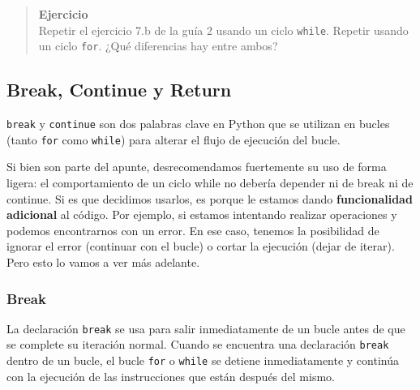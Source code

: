 \documentclass[
  letterpaper,
  DIV=11,
  numbers=noendperiod]{scrreprt}
\begin{document}
\begin{quote}
\textbf{Ejercicio}\\
Repetir el ejercicio 7.b de la guía 2 usando un ciclo \texttt{while}.
Repetir usando un ciclo \texttt{for}. ¿Qué diferencias hay entre ambos?
~
\end{quote}

\subsection{Break, Continue y Return}\label{break-continue-y-return}

\texttt{break} y \texttt{continue} son dos palabras clave en Python que
se utilizan en bucles (tanto \texttt{for} como \texttt{while}) para
alterar el flujo de ejecución del bucle.

\begin{tcolorbox}[enhanced jigsaw, opacitybacktitle=0.6, toptitle=1mm, toprule=.15mm, arc=.35mm, breakable, bottomrule=.15mm, opacityback=0, leftrule=.75mm, rightrule=.15mm, title=\textcolor{quarto-callout-warning-color}{\faExclamationTriangle}\hspace{0.5em}{Warning}, left=2mm, bottomtitle=1mm, colframe=quarto-callout-warning-color-frame, colback=white, titlerule=0mm, coltitle=black, colbacktitle=quarto-callout-warning-color!10!white]

Si bien son parte del apunte, desrecomendamos fuertemente su uso de
forma ligera: el comportamiento de un ciclo while no debería depender ni
de break ni de continue. Si es que decidimos usarlos, es porque le
estamos dando \textbf{funcionalidad adicional} al código. Por ejemplo,
si estamos intentando realizar operaciones y podemos encontrarnos con un
error. En ese caso, tenemos la posibilidad de ignorar el error
(continuar con el bucle) o cortar la ejecución (dejar de iterar). Pero
esto lo vamos a ver más adelante.

\end{tcolorbox}

\subsubsection{Break}\label{break}

La declaración \texttt{break} se usa para salir inmediatamente de un
bucle antes de que se complete su iteración normal. Cuando se encuentra
una declaración \texttt{break} dentro de un bucle, el bucle \texttt{for}
o \texttt{while} se detiene inmediatamente y continúa con la ejecución
de las instrucciones que están después del mismo.
\end{document}

